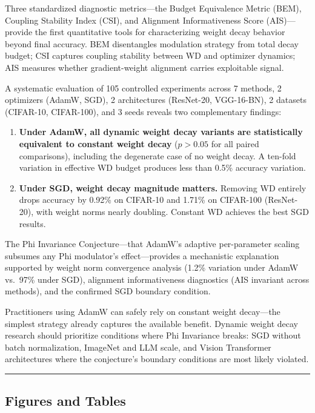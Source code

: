 \documentclass[
]{article}
\begin{document}
Three standardized diagnostic metrics---the Budget Equivalence Metric
(BEM), Coupling Stability Index (CSI), and Alignment Informativeness
Score (AIS)---provide the first quantitative tools for characterizing
weight decay behavior beyond final accuracy. BEM disentangles modulation
strategy from total decay budget; CSI captures coupling stability
between WD and optimizer dynamics; AIS measures whether gradient-weight
alignment carries exploitable signal.

A systematic evaluation of 105 controlled experiments across 7 methods,
2 optimizers (AdamW, SGD), 2 architectures (ResNet-20, VGG-16-BN), 2
datasets (CIFAR-10, CIFAR-100), and 3 seeds reveals two complementary
findings:

\begin{enumerate}
\def\labelenumi{\arabic{enumi}.}
\item
  \textbf{Under AdamW, all dynamic weight decay variants are
  statistically equivalent to constant weight decay} (\(p > 0.05\) for
  all paired comparisons), including the degenerate case of no weight
  decay. A ten-fold variation in effective WD budget produces less than
  0.5\% accuracy variation.
\item
  \textbf{Under SGD, weight decay magnitude matters.} Removing WD
  entirely drops accuracy by 0.92\% on CIFAR-10 and 1.71\% on CIFAR-100
  (ResNet-20), with weight norms nearly doubling. Constant WD achieves
  the best SGD results.
\end{enumerate}

The Phi Invariance Conjecture---that AdamW's adaptive per-parameter
scaling subsumes any Phi modulator's effect---provides a mechanistic
explanation supported by weight norm convergence analysis (1.2\%
variation under AdamW vs.~97\% under SGD), alignment informativeness
diagnostics (AIS invariant across methods), and the confirmed SGD
boundary condition.

Practitioners using AdamW can safely rely on constant weight decay---the
simplest strategy already captures the available benefit. Dynamic weight
decay research should prioritize conditions where Phi Invariance breaks:
SGD without batch normalization, ImageNet and LLM scale, and Vision
Transformer architectures where the conjecture's boundary conditions are
most likely violated.

\begin{center}\rule{0.5\linewidth}{0.5pt}\end{center}

\hypertarget{figures-and-tables}{%
\subsection{Figures and Tables}\label{figures-and-tables}}
\end{document}
